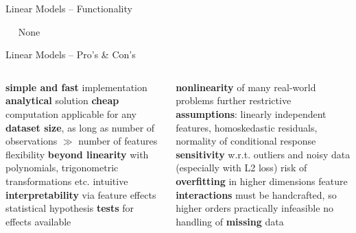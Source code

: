 \begin{vbframe}{Linear Models -- Functionality}
\medskip

 ~~ None

\medskip


\end{vbframe}


\begin{frame}{Linear Models -- Pro's \& Con's}

\footnotesize

\begin{columns}[onlytextwidth]
  \begin{column}{0.5\textwidth}
    \footnotesize
    \begin{itemize}
      \positem \textbf{simple and fast} implementation
      \positem \textbf{analytical} solution
      \positem \textbf{cheap} computation
      \positem applicable for any \textbf{dataset size}, as long as number of 
      observations $\gg$ number of features
      \positem flexibility \textbf{beyond linearity} with polynomials, 
      trigonometric transformations etc.
      \positem intuitive \textbf{interpretability} via feature effects
      \positem statistical hypothesis \textbf{tests} for effects available

    \end{itemize}
  \end{column}

  \begin{column}{0.5\textwidth}
    \footnotesize
    \begin{itemize}
      \negitem \textbf{nonlinearity} of many real-world problems
      \negitem further restrictive \textbf{assumptions}: linearly independent 
      features, homoskedastic residuals, normality of conditional response
      \negitem \textbf{sensitivity} w.r.t. outliers and noisy data (especially 
      with L2 loss)
      \negitem risk of \textbf{overfitting} in higher dimensions
      \negitem feature \textbf{interactions} must be handcrafted, so higher
      orders practically infeasible
      \negitem no handling of \textbf{missing} data
    \end{itemize}
  \end{column}
\end{columns}

\vfill

\small


\end{frame}

